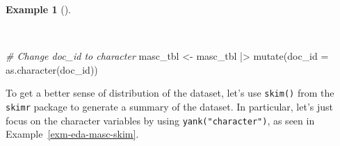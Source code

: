 \documentclass[
  letterpaper,
  DIV=11,
  numbers=noendperiod]{scrreport}
\newenvironment{Shaded}{\begin{snugshade}}{\end{snugshade}}
\newcommand{\AttributeTok}[1]{\textcolor[rgb]{0.00,0.00,0.00}{#1}}
\newcommand{\CommentTok}[1]{\textcolor[rgb]{0.00,0.00,0.00}{\textit{#1}}}
\newcommand{\FunctionTok}[1]{\textcolor[rgb]{0.00,0.00,0.00}{#1}}
\newcommand{\NormalTok}[1]{\textcolor[rgb]{0.00,0.00,0.00}{#1}}
\newcommand{\OtherTok}[1]{\textcolor[rgb]{0.00,0.00,0.00}{#1}}
\newcommand{\SpecialCharTok}[1]{\textcolor[rgb]{0.00,0.00,0.00}{#1}}
\theoremstyle{definition}
\newtheorem{example}{Example}[chapter]
\theoremstyle{remark}
\begin{document}
\begin{example}[]\protect\hypertarget{exm-eda-masc-doc-id}{}\label{exm-eda-masc-doc-id}

~

\begin{Shaded}
\begin{Highlighting}[]
\CommentTok{\# Change doc\_id to character}
\NormalTok{masc\_tbl }\OtherTok{\textless{}{-}} 
\NormalTok{  masc\_tbl }\SpecialCharTok{|\textgreater{}} 
  \FunctionTok{mutate}\NormalTok{(}\AttributeTok{doc\_id =} \FunctionTok{as.character}\NormalTok{(doc\_id))}
\end{Highlighting}
\end{Shaded}

\end{example}

To get a better sense of distribution of the dataset, let's use
\texttt{skim()} from the \texttt{skimr} package to generate a summary of
the dataset. In particular, let's just focus on the character variables
by using \texttt{yank("character")}, as seen in
Example~\ref{exm-eda-masc-skim}.
\end{document}
